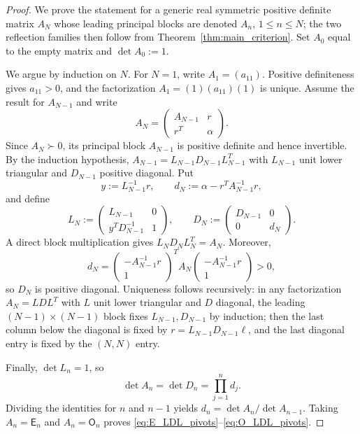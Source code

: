 \documentclass[11pt]{amsart}
\numberwithin{equation}{section}
\theoremstyle{plain}
\theoremstyle{definition}
\theoremstyle{remark}
\newcommand{\E}{\mathsf E}
\newcommand{\Omat}{\mathsf O}
\begin{document}
\begin{proof}
We prove the statement for a generic real symmetric positive definite matrix $A_N$ whose leading principal blocks are denoted $A_n$, $1\le n\le N$; the two reflection families then follow from Theorem~\ref{thm:main_criterion}.  Set $A_0$ equal to the empty matrix and $\det A_0:=1$.

We argue by induction on $N$.  For $N=1$, write $A_1=(a_{11})$.  Positive definiteness gives $a_{11}>0$, and the factorization $A_1=(1)(a_{11})(1)$ is unique.  Assume the result for $A_{N-1}$ and write
\begin{equation}
A_N=\begin{pmatrix}A_{N-1}&r\\ r^T&\alpha\end{pmatrix}.
\end{equation}
Since $A_N\succ0$, its principal block $A_{N-1}$ is positive definite and hence invertible.  By the induction hypothesis,
$A_{N-1}=L_{N-1}D_{N-1}L_{N-1}^T$ with $L_{N-1}$ unit lower triangular and $D_{N-1}$ positive diagonal.  Put
\begin{equation}
y:=L_{N-1}^{-1}r,
\qquad
 d_N:=\alpha-r^TA_{N-1}^{-1}r,
\end{equation}
and define
\begin{equation}
L_N:=\begin{pmatrix}L_{N-1}&0\\ y^TD_{N-1}^{-1}&1\end{pmatrix},
\qquad
D_N:=\begin{pmatrix}D_{N-1}&0\\0&d_N\end{pmatrix}.
\end{equation}
A direct block multiplication gives $L_ND_NL_N^T=A_N$.  Moreover,
\begin{equation}
d_N=
\begin{pmatrix}-A_{N-1}^{-1}r\\1\end{pmatrix}^{T}
A_N
\begin{pmatrix}-A_{N-1}^{-1}r\\1\end{pmatrix}>0,
\end{equation}
so $D_N$ is positive diagonal.  Uniqueness follows recursively: in any factorization $A_N=LDL^T$ with $L$ unit lower triangular and $D$ diagonal, the leading $(N-1)\times(N-1)$ block fixes $L_{N-1},D_{N-1}$ by induction; then the last column below the diagonal is fixed by $r=L_{N-1}D_{N-1}\ell$, and the last diagonal entry is fixed by the $(N,N)$ entry.

Finally, $\det L_n=1$, so
\begin{equation}
\det A_n=\det D_n=\prod_{j=1}^{n}d_j.
\end{equation}
Dividing the identities for $n$ and $n-1$ yields $d_n=\det A_n/\det A_{n-1}$.  Taking $A_n=\E_n$ and $A_n=\Omat_n$ proves \eqref{eq:E_LDL_pivots}--\eqref{eq:O_LDL_pivots}.
\end{proof}
\end{document}
